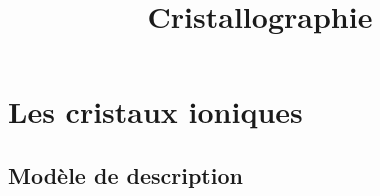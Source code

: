\documentclass[11pt,a4paper]{book}
\title{Cristallographie\\ \bsc{mpsi}}
\author{}
\date{}
\theoremstyle{plain}
\theoremstyle{definition}
\theoremstyle{remark}
\begin{document}
\maketitle
\frontmatter

\mainmatter
\tableofcontents
\listoffigures








\chapter{Les cristaux ioniques}
\section{Modèle de description}



\printindex
\end{document}
